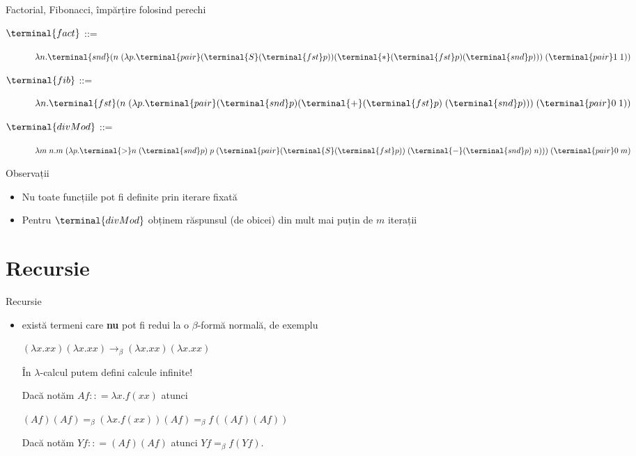 \documentclass[xcolor=pdftex,romanian,colorlinks]{beamer}
\newcommand{\ra}{\rightarrow}
\newcommand{\Splus}{\terminal{+}}
\newcommand{\Smul}{\terminal{*}}
\newcommand{\Ssucc}{\terminal{S}}
\newcommand{\Sgt}{\terminal{>}}
\newcommand{\Spair}{\terminal{pair}}
\newcommand{\Sfst}{\terminal{fst}}
\newcommand{\Ssnd}{\terminal{snd}}
\newcommand{\Sminus}{\terminal{-}}
\begin{document}
\begin{frame}{Factorial, Fibonacci, împărțire folosind perechi}
  \begin{description}
    \item[$\terminal{fact}$ ::= ] $\lambda n.\Ssnd (n\;(\lambda p. \Spair (\Ssucc (\Sfst p)) (\Smul (\Sfst p) (\Ssnd p)))\;(\Spair 1\; 1))$
    \pause
    \item[$\terminal{fib}$ ::= ] $\lambda n.\Sfst (n\; (\lambda p. \Spair (\Ssnd p) (\Splus (\Sfst p)\; (\Ssnd p)))\; (\Spair 0\; 1))$
    \pause
    \item[$\terminal{divMod}$ ::= ] $\lambda m\; n. m\; (\lambda p. \Sgt n\; (\Ssnd p)\; p\; (\Spair (\Ssucc (\Sfst p))\; (\Sminus (\Ssnd p)\; n)))\; (\Spair 0\; m)$
  \end{description}

    \pause
  \begin{block}{Observații}
    \begin{itemize}
      \item Nu toate funcțiile pot fi definite prin iterare fixată
      \item Pentru $\terminal{divMod}$ obținem răspunsul (de obicei) din mult mai puțin de $m$ iterații
    \end{itemize}
  \end{block}
\end{frame}

\section{Recursie}
\begin{frame}[fragile]{Recursie}
\begin{itemize}
\item exist\u a termeni care {\bf nu} pot fi redu\sh i la o $\beta$-form\u a normal\u a, de exemplu 

$(\lambda x. xx)(\lambda x. xx)\ra_\beta (\lambda x. xx)(\lambda x. xx)$

\^{I}n $\lambda$-calcul putem defini calcule infinite!

\pause

Dac\u a not\u am $Af :: = \lambda x. f (xx)$ atunci 

$(Af)(Af)=_\beta (\lambda x. f(xx))(Af)=_\beta f((Af)(Af))$

Dac\u a not\u am $Yf :: = (Af)(Af)$ atunci $Yf =_\beta f(Yf)$.

\end{itemize}
\end{frame}
\end{document}
